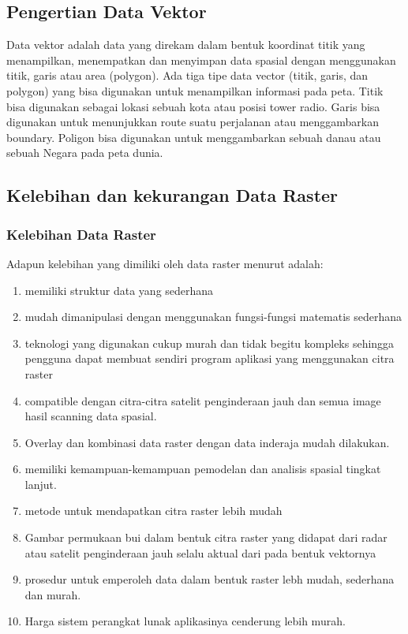 \subsection{Pengertian Data Vektor}
Data vektor adalah data yang direkam dalam bentuk koordinat titik yang menampilkan, 
menempatkan dan menyimpan data spasial dengan menggunakan titik, 
garis atau area (polygon). Ada tiga tipe data vector (titik, garis, 
dan polygon) yang bisa digunakan untuk menampilkan informasi pada peta. 
Titik bisa digunakan sebagai lokasi sebuah kota atau posisi tower radio. 
Garis bisa digunakan untuk menunjukkan route suatu perjalanan atau menggambarkan boundary. 
Poligon bisa digunakan untuk menggambarkan sebuah danau atau sebuah Negara pada peta dunia.

\subsection{Kelebihan dan kekurangan Data Raster}
\subsubsection{Kelebihan Data Raster}
Adapun kelebihan yang dimiliki oleh data raster menurut \cite{irwansyah2013sistem} adalah: 
	\begin{enumerate}
		\item memiliki struktur data yang sederhana
		\item mudah dimanipulasi dengan menggunakan fungsi-fungsi matematis sederhana
		\item teknologi yang digunakan cukup murah dan tidak begitu kompleks sehingga pengguna dapat membuat sendiri program aplikasi yang menggunakan citra raster
		\item compatible dengan citra-citra satelit penginderaan jauh dan semua image hasil scanning data spasial.
		\item Overlay dan kombinasi data raster dengan data inderaja mudah dilakukan.
		\item memiliki kemampuan-kemampuan pemodelan dan analisis  spasial tingkat lanjut.
		\item metode untuk mendapatkan citra raster lebih mudah
		\item Gambar permukaan bui dalam bentuk citra raster yang didapat dari radar atau satelit penginderaan jauh selalu aktual dari pada bentuk vektornya
		\item prosedur untuk emperoleh data dalam bentuk raster lebh mudah, sederhana dan murah.
		\item Harga sistem perangkat lunak aplikasinya cenderung lebih murah.
	\end{enumerate}

